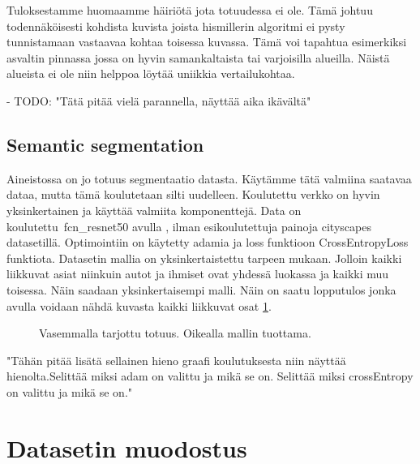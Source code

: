 Tuloksestamme huomaamme häiriötä jota totuudessa ei ole.
Tämä johtuu todennäköisesti kohdista kuvista joista hismillerin algoritmi ei pysty tunnistamaan vastaavaa kohtaa toisessa kuvassa.
Tämä voi tapahtua esimerkiksi asvaltin pinnassa jossa on hyvin samankaltaista tai varjoisilla alueilla.
Näistä alueista ei ole niin helppoa löytää uniikkia vertailukohtaa. 

- TODO: "Tätä pitää vielä parannella, näyttää aika ikävältä"

\subsection{Semantic segmentation}

Aineistossa on jo totuus segmentaatio datasta. Käytämme tätä valmiina saatavaa dataa, mutta tämä koulutetaan silti uudelleen. Koulutettu verkko on hyvin yksinkertainen ja käyttää valmiita komponenttejä. Data on koulutettu\ fcn\_resnet50 avulla \cite{pytorchfcnresnet50}, ilman esikoulutettuja painoja cityscapes datasetillä. Optimointiin on käytetty adamia ja loss funktioon CrossEntropyLoss funktiota. Datasetin mallia on yksinkertaistettu tarpeen mukaan. Jolloin kaikki liikkuvat asiat niinkuin autot ja ihmiset ovat yhdessä luokassa ja kaikki muu toisessa. Näin saadaan yksinkertaisempi malli. Näin on saatu lopputulos jonka avulla voidaan nähdä kuvasta kaikki liikkuvat osat \ref{fig:segmentation1}.

\begin{figure}
\centering
{}
\caption[Tämä on lyhyt kuvateksti.]{Vasemmalla tarjottu totuus. Oikealla mallin tuottama.}
\label{fig:segmentation1}
\end{figure}
    

"Tähän pitää lisätä sellainen hieno graafi koulutuksesta niin näyttää hienolta.Selittää miksi adam on valittu ja mikä se on. Selittää miksi crossEntropy on valittu ja mikä se on."

\section{Datasetin muodostus}


